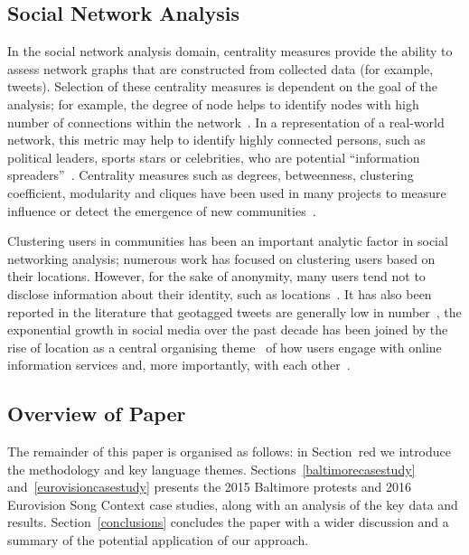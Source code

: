 \subsection{Social Network Analysis}

In the social network analysis domain, centrality measures
provide the ability to assess network graphs that are constructed from
collected data (for example, tweets). Selection of these centrality
measures is dependent on the goal of the analysis; for example, the
degree of node helps to identify nodes with high number of connections
within the
network~\cite{borgatti+everett:2000,rombach-et-al:2014,liu-et-al:2014}.
In a representation of a real-world network, this metric may help to
identify highly connected persons, such as political leaders, sports
stars or celebrities, who are potential ``information
spreaders''~\cite{cha-et-al:2012,borge-holthoefer-et-al:2012,zhang-et-al:2016}.
Centrality measures such as degrees, betweenness, clustering
coefficient, modularity and cliques have been used in many projects to
measure influence or detect the emergence of new
communities~\cite{willis-et-al:2015,oatley+crick:2015}.

Clustering users in communities has been an important analytic factor
in social networking analysis; numerous work has focused on clustering
users based on their locations. However, for the sake of anonymity,
many users tend not to disclose information about their identity, such
as locations~\cite{kang-et-al:2013}. It has also been reported in the
literature that geotagged tweets are generally low in
number~\cite{morstatter-et-al:2013,tan-et-al:2013,kumar-et-al:2014},
the exponential growth in social media over the past decade has been
joined by the rise of location as a central organising
theme~\cite{liang-et-al:2013} of how users engage with online
information services and, more importantly, with each
other~\cite{cheng-et-al:2010,caverlee-et-al:2013}.

\subsection{Overview of Paper}

The remainder of this paper is organised as follows: in
Section~red\label{method} we introduce the methodology and key
language themes.  Sections~\ref{baltimorecasestudy}
and~\ref{eurovisioncasestudy} presents the 2015 Baltimore protests and
2016 Eurovision Song Context case studies, along with an analysis of
the key data and results. Section~\ref{conclusions} concludes the
paper with a wider discussion and a summary of the potential
application of our approach.

